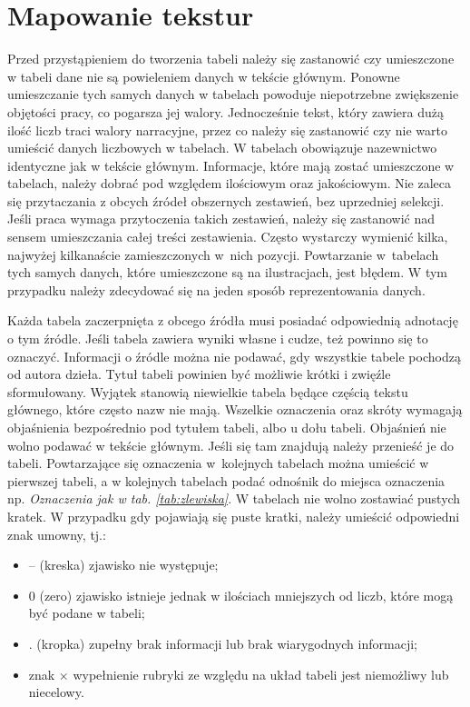 \section{Mapowanie tekstur}

Przed przystąpieniem do tworzenia tabeli należy się zastanowić czy umieszczone w tabeli dane nie są powieleniem danych w tekście głównym. Ponowne umieszczanie tych samych danych w tabelach powoduje niepotrzebne zwiększenie objętości pracy, co pogarsza jej walory. Jednocześnie tekst, który zawiera dużą ilość liczb traci walory narracyjne, przez co należy się zastanowić czy nie warto umieścić danych liczbowych w tabelach. W tabelach obowiązuje nazewnictwo identyczne jak w tekście głównym. Informacje, które mają zostać umieszczone w tabelach, należy dobrać pod względem ilościowym oraz jakościowym. Nie zaleca się przytaczania z obcych źródeł obszernych zestawień, bez uprzedniej selekcji. Jeśli praca wymaga przytoczenia takich zestawień, należy się zastanowić nad sensem umieszczania całej treści zestawienia. Często wystarczy wymienić kilka, najwyżej kilkanaście zamieszczonych w~nich pozycji. Powtarzanie w~tabelach tych samych danych, które umieszczone są na ilustracjach, jest błędem. W tym przypadku należy zdecydować się na jeden sposób reprezentowania danych.


Każda tabela zaczerpnięta z obcego źródła musi posiadać odpowiednią adnotację o tym źródle. Jeśli tabela zawiera wyniki własne i cudze, też powinno się to oznaczyć. Informacji o źródle można nie podawać, gdy wszystkie tabele pochodzą od autora dzieła. Tytuł tabeli powinien być możliwie krótki i zwięźle sformułowany. Wyjątek stanowią niewielkie tabela będące częścią tekstu głównego, które często nazw nie mają. Wszelkie oznaczenia oraz skróty wymagają objaśnienia bezpośrednio pod tytułem tabeli, albo u dołu tabeli. Objaśnień nie wolno podawać w tekście głównym. Jeśli się tam znajdują należy przenieść je do tabeli. Powtarzające się oznaczenia w~kolejnych tabelach można umieścić w pierwszej tabeli, a w kolejnych tabelach podać odnośnik do miejsca oznaczenia np. \textit{Oznaczenia jak w tab. \ref{tab:zlewiska}}. W tabelach nie wolno zostawiać pustych kratek. W przypadku gdy pojawiają się puste kratki, należy umieścić odpowiedni znak umowny, tj.:
\begin{itemize}
\item -- (kreska) \pauza zjawisko nie występuje;
\item 0 (zero) \pauza zjawisko istnieje jednak w ilościach mniejszych od liczb, które mogą być podane w tabeli;
\item . (kropka) \pauza zupełny brak informacji lub brak wiarygodnych informacji;
\item znak $\times$ \pauza wypełnienie rubryki ze względu na układ tabeli jest niemożliwy lub niecelowy.
\end{itemize}  